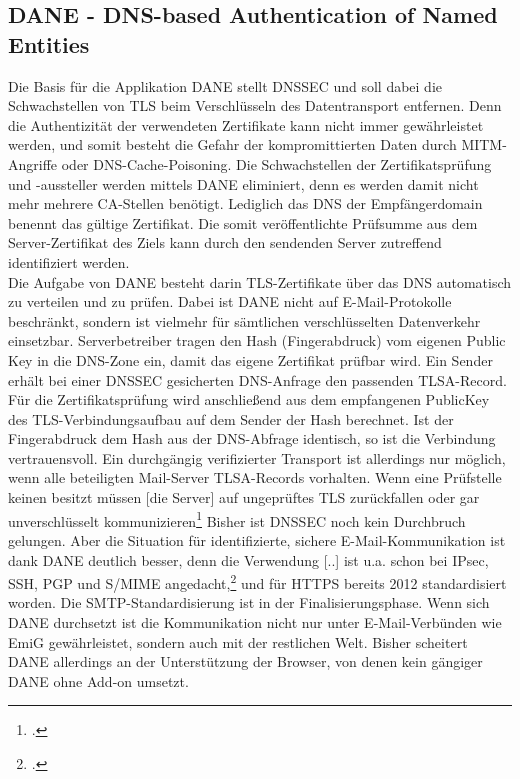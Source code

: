 \documentclass  [paper=a4,
				fontsize=12pt,
				listof=totoc,
				bibliography=totoc
				]{scrreprt}
\begin{document}
		\subsection{DANE - DNS-based Authentication of Named Entities}
		\label{subsec:dane}                                             
			Die Basis für die Applikation \ac{DANE} stellt \ac{DNSSEC} und soll dabei die Schwachstellen von \ac{TLS} beim Verschlüsseln des Datentransport entfernen. Denn die Authentizität der verwendeten Zertifikate kann nicht immer gewährleistet werden, und somit besteht die Gefahr der kompromittierten Daten durch \ac{MITM}-Angriffe oder \ac{DNS}-Cache-Poisoning.
			Die Schwachstellen der Zertifikatsprüfung und -aussteller werden mittels \ac{DANE} eliminiert, denn es werden damit nicht mehr mehrere CA-Stellen benötigt. Lediglich das DNS der Empfängerdomain benennt das gültige Zertifikat. Die somit  veröffentlichte Prüfsumme aus dem Server-Zertifikat des Ziels kann durch den sendenden Server zutreffend identifiziert werden.\medskip\\
			Die Aufgabe von \ac{DANE} besteht darin \ac{TLS}-Zertifikate über das \ac{DNS} automatisch zu verteilen und zu prüfen. Dabei ist \ac{DANE} nicht auf E-Mail-Protokolle beschränkt, sondern ist vielmehr für sämtlichen verschlüsselten Datenverkehr einsetzbar.
			Serverbetreiber tragen den Hash (Fingerabdruck) vom eigenen Public Key in die \ac{DNS}-Zone ein, damit das eigene Zertifikat prüfbar wird. Ein Sender erhält bei einer \ac{DNSSEC} gesicherten \ac{DNS}-Anfrage den passenden \ac{TLSA}-Record. Für die Zertifikatsprüfung wird anschließend aus dem empfangenen PublicKey des \ac{TLS}-Verbindungsaufbau auf dem Sender der Hash berechnet. Ist der Fingerabdruck dem Hash aus der \ac{DNS}-Abfrage identisch, so ist die Verbindung vertrauensvoll.
			Ein durchgängig verifizierter Transport ist allerdings nur möglich, wenn alle beteiligten Mail-Server \ac{TLSA}-Records vorhalten. Wenn eine Prüfstelle keinen besitzt \glqq müssen [die Server] auf ungeprüftes \ac{TLS} zurückfallen oder gar unverschlüsselt kommunizieren\grqq\footcite[][S. 197]{Koetter2014}
			Bisher ist \ac{DNSSEC} noch kein Durchbruch gelungen. Aber die Situation für identifizierte, sichere E-Mail-Kommunikation ist dank \ac{DANE} deutlich besser, denn \glqq die Verwendung [..] ist u.a. schon bei \ac{IPsec}, \ac{SSH}, \ac{PGP} und \ac{S/MIME} angedacht,\grqq\footcite[][S. 196]{Koetter2014} und für \ac{HTTPS} bereits 2012 standardisiert worden. Die \ac{SMTP}-Standardisierung ist in der Finalisierungsphase. Wenn sich \ac{DANE} durchsetzt ist die Kommunikation nicht nur unter E-Mail-Verbünden wie \ac{EmiG} gewährleistet, sondern auch mit der restlichen Welt. Bisher scheitert \ac{DANE} allerdings an der Unterstützung der Browser, von denen kein gängiger \ac{DANE} ohne Add-on umsetzt.
	\pagebreak
\end{document}
